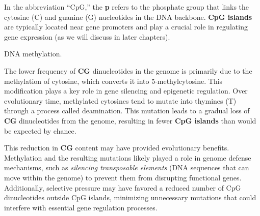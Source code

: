 In the abbreviation ``CpG,'' the \textbf{p} refers to the phosphate group that links the cytosine (C) and guanine (G) nucleotides in the DNA backbone. \textbf{CpG islands} are typically located near gene promoters and play a crucial role in regulating gene expression (as we will discuss in later chapters).

\begin{marginfigure}
  \caption[6pt]{DNA methylation.}
  \label{fig:g-dna-methylation}
\end{marginfigure}

The lower frequency of \textbf{CG} dinucleotides in the genome is primarily due to the methylation of cytosine, which converts it into 5-methylcytosine. This modification plays a key role in gene silencing and epigenetic regulation. Over evolutionary time, methylated cytosines tend to mutate into thymines (T) through a process called deamination. This mutation leads to a gradual loss of \textbf{CG} dinucleotides from the genome, resulting in fewer \textbf{CpG islands} than would be expected by chance.

This reduction in \textbf{CG} content may have provided evolutionary benefits. Methylation and the resulting mutations likely played a role in genome defense mechanisms, such as \textit{silencing transposable elements} (DNA sequences that can move within the genome) to prevent them from disrupting functional genes. Additionally, selective pressure may have favored a reduced number of CpG dinucleotides outside CpG islands, minimizing unnecessary mutations that could interfere with essential gene regulation processes.

